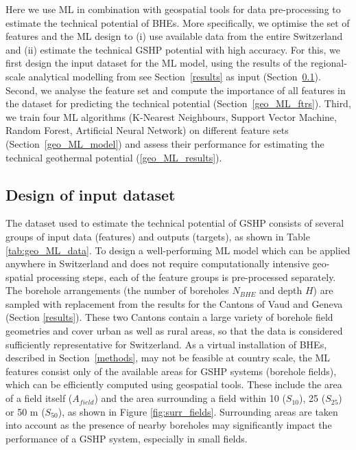 Here we use ML in combination with geospatial tools for data pre-processing to estimate the technical potential of BHEs. 
More specifically, we optimise the set of features and the ML design to (i) use available data from the entire Switzerland and (ii) estimate the technical GSHP potential with high accuracy. 
For this, we first design the input dataset for the ML model, using the results of the regional-scale analytical modelling from see Section~\ref{results} as input (Section~\ref{geo_ML_data}).
Second, we analyse the feature set and compute the importance of all features in the dataset for predicting the technical potential (Section~\ref{geo_ML_ftrs}). 
Third, we train four ML algorithms (K-Nearest Neighbours, Support Vector Machine, Random Forest, Artificial Neural Network) on different feature sets (Section~\ref{geo_ML_model}) and assess their performance for estimating the technical geothermal potential (\ref{geo_ML_results}).

\subsection{Design of input dataset}
\label{geo_ML_data}

The dataset used to estimate the technical potential of GSHP consists of several groups of input data (features) and outputs (targets), as shown in Table \ref{tab:geo_ML_data}. To design a well-performing ML model which can be applied anywhere in Switzerland and does not require computationally intensive geo-spatial processing steps, each of the feature groups is pre-processed separately. The borehole arrangements (the number of boreholes $N_{BHE}$ and depth $H$) are sampled with replacement from the results for the Cantons of Vaud and Geneva (Section \ref{results}). These two Cantons contain a large variety of borehole field geometries and cover urban as well as rural areas, so that the data is considered sufficiently representative for Switzerland. As a virtual installation of BHEs, described in Section~\ref{methods}, may not be feasible at country scale, the ML features consist only of the available areas for GSHP systems (borehole fields), which can be efficiently computed using geospatial tools. These include the area of a field itself ($A_{field}$) and the area surrounding a field within 10 ($S_{10}$), 25 ($S_{25}$) or 50 m ($S_{50}$), as shown in Figure \ref{fig:surr_fields}. Surrounding areas are taken into account as the presence of nearby boreholes may significantly impact the performance of a GSHP system, especially in small fields.

